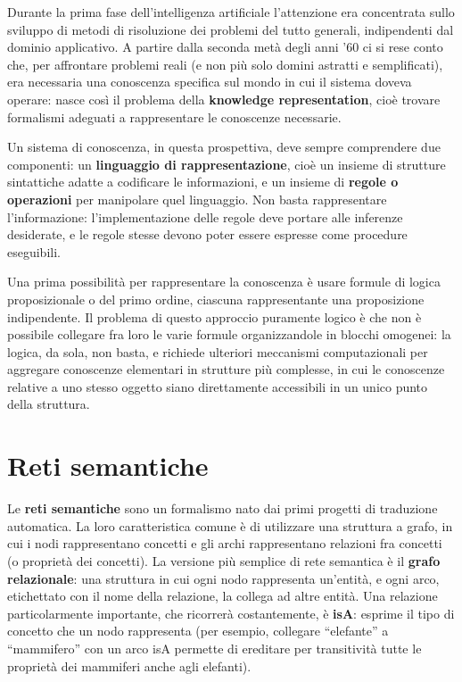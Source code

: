 \documentclass[11pt,a4paper]{report}
\begin{document}
Durante la prima fase dell'intelligenza artificiale l'attenzione era concentrata sullo sviluppo di metodi di risoluzione dei problemi del tutto generali, indipendenti dal dominio applicativo. A partire dalla seconda metà degli anni '60 ci si rese conto che, per affrontare problemi reali (e non più solo domini astratti e semplificati), era necessaria una conoscenza specifica sul mondo in cui il sistema doveva operare: nasce così il problema della \textbf{knowledge representation}, cioè trovare formalismi adeguati a rappresentare le conoscenze necessarie.

Un sistema di conoscenza, in questa prospettiva, deve sempre comprendere due componenti: un \textbf{linguaggio di rappresentazione}, cioè un insieme di strutture sintattiche adatte a codificare le informazioni, e un insieme di \textbf{regole o operazioni} per manipolare quel linguaggio. Non basta rappresentare l'informazione: l'implementazione delle regole deve portare alle inferenze desiderate, e le regole stesse devono poter essere espresse come procedure eseguibili.

Una prima possibilità per rappresentare la conoscenza è usare formule di logica proposizionale o del primo ordine, ciascuna rappresentante una proposizione indipendente. Il problema di questo approccio puramente logico è che non è possibile collegare fra loro le varie formule organizzandole in blocchi omogenei: la logica, da sola, non basta, e richiede ulteriori meccanismi computazionali per aggregare conoscenze elementari in strutture più complesse, in cui le conoscenze relative a uno stesso oggetto siano direttamente accessibili in un unico punto della struttura.

\section{Reti semantiche}

Le \textbf{reti semantiche} sono un formalismo nato dai primi progetti di traduzione automatica. La loro caratteristica comune è di utilizzare una struttura a grafo, in cui i nodi rappresentano concetti e gli archi rappresentano relazioni fra concetti (o proprietà dei concetti). La versione più semplice di rete semantica è il \textbf{grafo relazionale}: una struttura in cui ogni nodo rappresenta un'entità, e ogni arco, etichettato con il nome della relazione, la collega ad altre entità. Una relazione particolarmente importante, che ricorrerà costantemente, è \textbf{isA}: esprime il tipo di concetto che un nodo rappresenta (per esempio, collegare ``elefante'' a ``mammifero'' con un arco isA permette di ereditare per transitività tutte le proprietà dei mammiferi anche agli elefanti).
\end{document}
